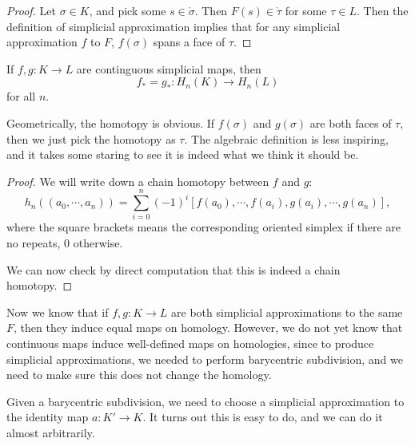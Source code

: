 \documentclass[a4paper]{article}
\begin{document}
\begin{proof}
  Let $\sigma \in K$, and pick some $s \in \mathring{\sigma}$. Then $F(s) \in \mathring{\tau}$ for some $\tau \in L$. Then the definition of simplicial approximation implies that for any simplicial approximation $f$ to $F$, $f(\sigma)$ spans a face of $\tau$.
\end{proof}

\begin{lemma}
  If $f, g: K \to L$ are continguous simplicial maps, then
  \[
    f_* = g_* : H_n(K) \to H_n(L)
  \]
  for all $n$.
\end{lemma}

Geometrically, the homotopy is obvious. If $f(\sigma)$ and $g(\sigma)$ are both faces of $\tau$, then we just pick the homotopy as $\tau$. The algebraic definition is less inspiring, and it takes some staring to see it is indeed what we think it should be.
\begin{proof}
  We will write down a chain homotopy between $f$ and $g$:
  \[
    h_n((a_0, \cdots, a_n)) = \sum_{i = 0}^n (-1)^i [f(a_0), \cdots, f(a_i), g(a_i), \cdots, g(a_n)],
  \]
  where the square brackets means the corresponding oriented simplex if there are no repeats, $0$ otherwise.

  We can now check by direct computation that this is indeed a chain homotopy.
\end{proof}

Now we know that if $f, g:K \to L$ are both simplicial approximations to the same $F$, then they induce equal maps on homology. However, we do not yet know that continuous maps induce well-defined maps on homologies, since to produce simplicial approximations, we needed to perform barycentric subdivision, and we need to make sure this does not change the homology.
\begin{center}
\end{center}
Given a barycentric subdivision, we need to choose a simplicial approximation to the identity map $a: K' \to K$. It turns out this is easy to do, and we can do it almost arbitrarily.
\end{document}
